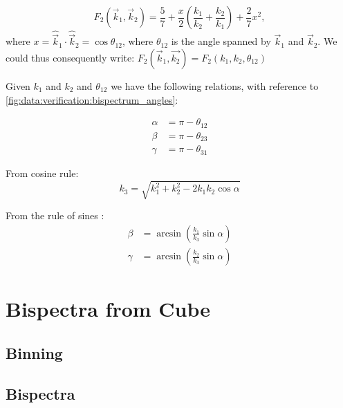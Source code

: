   \begin{equation}
    F_2(\vec{k}_1,\vec{k}_2) = \frac{5}{7} + \frac{x}{2}\left(\frac{k_1}{k_2}+\frac{k_2}{k_1}\right) + \frac{2}{7}x^2,
  \end{equation}
  where $x = \hat{\vec{k}}_1 \cdot \hat{\vec{k}}_2 = \cos{\theta_{12}}$, where $\theta_{12}$ is the angle spanned by $\vec{k}_1$ and $\vec{k}_2$. We could thus consequently write: $F_2(\vec{k}_1,\vec{k_2}) = F_2(k_1,k_2,\theta_{12})$

  Given $k_1$ and $k_2$ and $\theta_{12}$ we have the following relations, with reference to \cref{fig:data:verification:bispectrum_angles}:


  \begin{equation}
    \begin{split}
      \alpha &= \pi-\theta_{12}\\
      \beta &= \pi-\theta_{23}\\
      \gamma &= \pi-\theta_{31}
    \end{split}
  \end{equation} 

  From cosine rule:
  \begin{equation}
    k_3 = \sqrt{k_1^2 + k_2^2 - 2k_1k_2\cos\alpha}
  \end{equation}

  From the rule of sines :
  \begin{equation}
    \begin{split}
      \beta &= \arcsin\left(\frac{k_1}{k_3}\sin\alpha\right)\\
      \gamma &= \arcsin\left(\frac{k_2}{k_3}\sin\alpha\right)
    \end{split}
  \end{equation}

  \begin{figure}
    \centering
  \end{figure}

\section{Bispectra from Cube}
  \subsection{Binning}

    \begin{figure}
      \centering
    \end{figure}

  \subsection{Bispectra}
    \begin{figure}
      \centering
    \end{figure}



